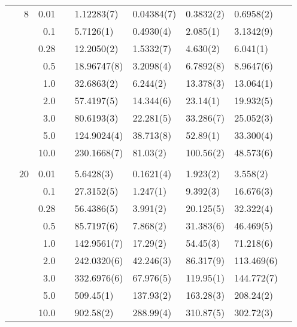 \begin{table}[H]
\begin{tabularx}{\textwidth}{R{1cm}rrcR{2.3cm}R{2.3cm}R{2.3cm}R{2.3cm}R{1cm}}
		&8 & 0.01 && 1.12283(7) & 0.04384(7) & 0.3832(2) & 0.6958(2) \\
		&& 0.1 && 5.7126(1) & 0.4930(4) & 2.085(1) & 3.1342(9) \\
		&& 0.28 && 12.2050(2) & 1.5332(7) & 4.630(2) & 6.041(1) \\
		&& 0.5 && 18.96747(8) & 3.2098(4) & 6.7892(8) & 8.9647(6) \\
		&& 1.0 && 32.6863(2) & 6.244(2) & 13.378(3) & 13.064(1) \\
		&& 2.0 && 57.4197(5) & 14.344(6) & 23.14(1) & 19.932(5) \\
		&& 3.0 && 80.6193(3) & 22.281(5) & 33.286(7) & 25.052(3) \\ 
		&& 5.0 && 124.9024(4) & 38.713(8) & 52.89(1) & 33.300(4) \\
		&& 10.0 && 230.1668(7) & 81.03(2) & 100.56(2) & 48.573(6) \\
		\hdashline \\
		
		&20 & 0.01 && 5.6428(3) & 0.1621(4) & 1.923(2) & 3.558(2) \\
		&& 0.1 && 27.3152(5) & 1.247(1) & 9.392(3) & 16.676(3) \\
		&& 0.28 && 56.4386(5) & 3.991(2) & 20.125(5) & 32.322(4) \\
		&& 0.5 && 85.7197(6) & 7.868(2) & 31.383(6) & 46.469(5) \\
		&& 1.0 && 142.9561(7) & 17.29(2) & 54.45(3) & 71.218(6) \\
		&& 2.0 && 242.0320(6) & 42.246(3) & 86.317(9) & 113.469(6) \\
		&& 3.0 && 332.6976(6) & 67.976(5) & 119.95(1) & 144.772(7) \\ 
		&& 5.0 && 509.45(1) & 137.93(2) & 163.28(3) & 208.24(2) \\
		&& 10.0 && 902.58(2) & 288.99(4) & 310.87(5) & 302.72(3) \\
		\hline \hline
	\end{tabularx}
\end{table}

